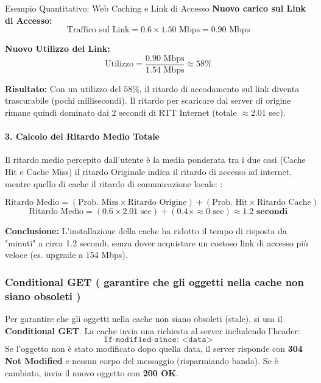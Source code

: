 \documentclass[a4paper,12pt]{report}
\begin{document}
\begin{esempiobox}{Esempio Quantitativo: Web Caching e Link di Accesso}
    \textbf{Nuovo carico sul Link di Accesso:}
    \[
    \text{Traffico sul Link} = 0.6 \times 1.50 \text{ Mbps} = 0.90 \text{ Mbps}
    \]

    \textbf{Nuovo Utilizzo del Link:}
    \[
    \text{Utilizzo} = \frac{0.90 \text{ Mbps}}{1.54 \text{ Mbps}} \approx 58\%
    \]
    
    \textbf{Risultato:} Con un utilizzo del $58\%$, il ritardo di accodamento sul link diventa trascurabile (pochi millisecondi). Il ritardo per scaricare dal server di origine rimane quindi dominato dai 2 secondi di RTT Internet (totale $\approx 2.01$ sec).

    \hrulefill

    \paragraph{3. Calcolo del Ritardo Medio Totale}
    Il ritardo medio percepito dall'utente è la media ponderata tra i due casi (Cache Hit e Cache Miss)
    il ritardo Originale indica il ritardo di accesso ad internet, mentre quello di cache il ritardo di comunicazione locale:
    :
    
    \[
    \text{Ritardo Medio} = (\text{Prob. Miss} \times \text{Ritardo Origine}) + (\text{Prob. Hit} \times \text{Ritardo Cache})
    \]
    \[
    \text{Ritardo Medio} = (0.6 \times 2.01 \text{ sec}) + (0.4 \times \approx 0 \text{ sec}) \approx \mathbf{1.2 \text{ secondi}}
    \]

    \textbf{Conclusione:} L'installazione della cache ha ridotto il tempo di risposta da "minuti" a circa 1.2 secondi, senza dover acquistare un costoso link di accesso più veloce (es. upgrade a 154 Mbps).
\end{esempiobox}







\newpage
\subsubsection{Conditional GET ( garantire che gli oggetti nella cache non siano obsoleti )}
Per garantire che gli oggetti nella cache non siano obsoleti (stale), si usa il \textbf{Conditional GET}.
La cache invia una richiesta al server includendo l'header:
\[ \texttt{If-modified-since: <data>} \]
Se l'oggetto non è stato modificato dopo quella data, il server risponde con \textbf{304 Not Modified} e nessun corpo del messaggio (risparmiando banda). Se è cambiato, invia il nuovo oggetto con \textbf{200 OK}.
\end{document}
